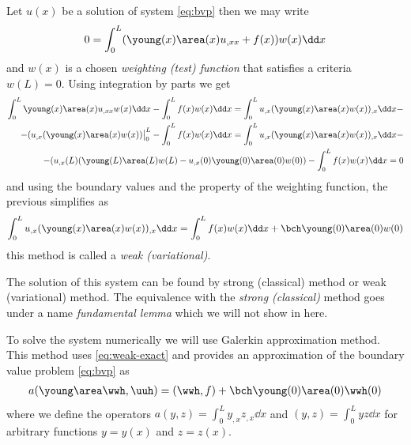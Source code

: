\documentclass[twoside,a4paper,12pt]{article}
\begin{document}
Let $u(x)$ be a solution of system \eqref{eq:bvp} then we may write
%
\begin{align}
  0 = \int_0^L (\young(x) \area(x) u_{,xx} + f(x)) w(x) \dd x 
\end{align}
and $w(x)$ is a chosen \emph{weighting (test) function} that satisfies a
criteria $w(L)=0$.
%
Using integration by parts we get
%
\begin{align}
  \int_0^L \young(x) \area(x) u_{,xx} w(x) \dd x 
  -\int_0^L f(x) w(x) \dd x  =
   \int_0^L u_{,x} (\young(x) \area(x) w(x))_{,x} \dd x -\nonumber \\ -
  (u_{,x} (\young(x) \area(x)  w(x))\big|_0^L -
  \int_0^L f(x) w(x) \dd x =  
  \int_0^L u_{,x} (\young(x) \area(x) w(x))_{,x} \dd x -\nonumber \\ -
  (u_{,x}(L) (\young(L) \area(L)  w(L) -
  u_{,x}(0) \young(0) \area(0)  w(0)) 
  -\int_0^L f(x) w(x) \dd x = 0
\end{align}
%
and using the boundary values and the property of the weighting
function, the previous simplifies as
%
\begin{align}
  \int_0^L u_{,x} (\young(x) \area(x) w(x))_{,x} \dd x =  
  \int_0^L f(x) w(x) \dd x + \bch \young(0) \area(0)  w(0)
  \label{eq:weak-exact}
\end{align}
%
this method is called a \emph{weak (variational)}.

The solution of this system can be found by strong (classical) method
or weak (variational) method. The equivalence with the \emph{strong
  (classical)} method goes under a name \emph{fundamental lemma} which we will not show in here.

To solve the system numerically we will use Galerkin approximation
method. This method uses \eqref{eq:weak-exact} and provides an
approximation of the boundary value problem \eqref{eq:bvp} as
%
\begin{align}
a(\young\area\wwh,\uuh) = (\wwh,f) + \bch \young(0)\area(0)\wwh(0) \label{eq:weak-approx}
\end{align}
%
where we define the operators $a(y,z) = \int_0^L y_{,x} z_{,x} \dd x$
and $(y,z) = \int_0^L y z \dd x$ for arbitrary functions $y = y(x)$
and $z= z(x)$.
\end{document}
